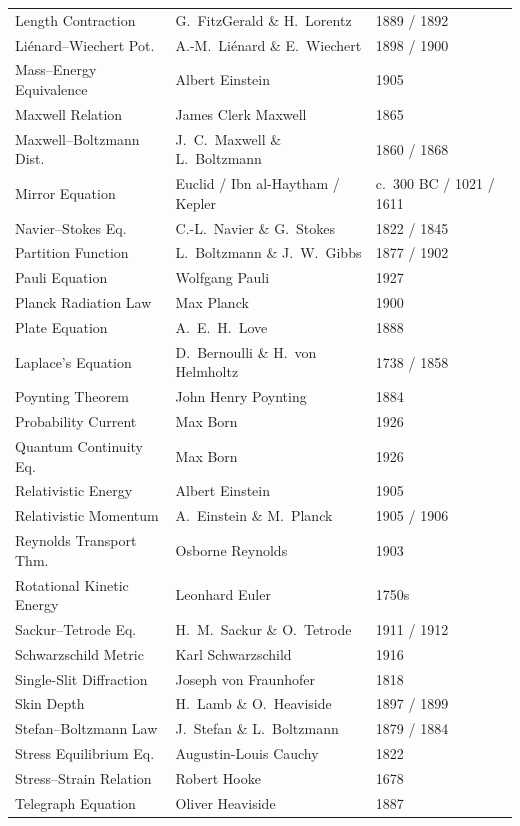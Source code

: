 \documentclass[11pt,openright]{book}
\begin{document}
\begin{longtable}{p{6cm}p{6cm}p{2.5cm}}
Length Contraction & G.\ FitzGerald \& H.\ Lorentz & 1889 / 1892 \\
Li\'enard--Wiechert Pot. & A.-M.\ Li\'enard \& E.\ Wiechert & 1898 / 1900 \\
Mass--Energy Equivalence & Albert Einstein & 1905 \\
Maxwell Relation & James Clerk Maxwell & 1865 \\
Maxwell--Boltzmann Dist. & J.\ C.\ Maxwell \& L.\ Boltzmann & 1860 / 1868 \\
Mirror Equation & Euclid / Ibn al-Haytham / Kepler & c.\ 300 BC / 1021 / 1611 \\
Navier--Stokes Eq. & C.-L.\ Navier \& G.\ Stokes & 1822 / 1845 \\
Partition Function & L.\ Boltzmann \& J.\ W.\ Gibbs & 1877 / 1902 \\
Pauli Equation & Wolfgang Pauli & 1927 \\
Planck Radiation Law & Max Planck & 1900 \\
Plate Equation & A.\ E.\ H.\ Love & 1888 \\
Laplace's Equation & D.\ Bernoulli \& H.\ von Helmholtz & 1738 / 1858 \\
Poynting Theorem & John Henry Poynting & 1884 \\
Probability Current & Max Born & 1926 \\
Quantum Continuity Eq. & Max Born & 1926 \\
Relativistic Energy & Albert Einstein & 1905 \\
Relativistic Momentum & A.\ Einstein \& M.\ Planck & 1905 / 1906 \\
Reynolds Transport Thm. & Osborne Reynolds & 1903 \\
Rotational Kinetic Energy & Leonhard Euler & 1750s \\
Sackur--Tetrode Eq. & H.\ M.\ Sackur \& O.\ Tetrode & 1911 / 1912 \\
Schwarzschild Metric & Karl Schwarzschild & 1916 \\
Single-Slit Diffraction & Joseph von Fraunhofer & 1818 \\
Skin Depth & H.\ Lamb \& O.\ Heaviside & 1897 / 1899 \\
Stefan--Boltzmann Law & J.\ Stefan \& L.\ Boltzmann & 1879 / 1884 \\
Stress Equilibrium Eq. & Augustin-Louis Cauchy & 1822 \\
Stress--Strain Relation & Robert Hooke & 1678 \\
Telegraph Equation & Oliver Heaviside & 1887 \\

\end{longtable}
\end{document}
